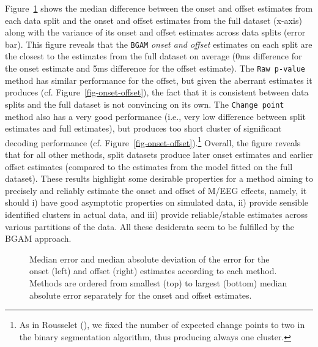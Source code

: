 \documentclass[
  doc,
  floatsintext,
  longtable,
  a4paper,
  nolmodern,
  notxfonts,
  notimes,
  donotrepeattitle,
  colorlinks=true,linkcolor=blue,citecolor=blue,urlcolor=blue]{apa7}
\begin{document}
Figure~\ref{fig-reliability} shows the median difference between the
onset and offset estimates from each data split and the onset and offset
estimates from the full dataset (x-axis) along with the variance of its
onset and offset estimates across data splits (error bar). This figure
reveals that the \texttt{BGAM} \emph{onset and offset} estimates on each
split are the closest to the estimates from the full dataset on average
(0ms difference for the onset estimate and 5ms difference for the offset
estimate). The \texttt{Raw\ p-value} method has similar performance for
the offset, but given the aberrant estimates it produces (cf.
Figure~\ref{fig-onset-offset}), the fact that it is consistent between
data splits and the full dataset is not convincing on its own. The
\texttt{Change\ point} method also has a very good performance (i.e.,
very low difference between split estimates and full estimates), but
produces too short cluster of significant decoding performance (cf.
Figure~\ref{fig-onset-offset}).\footnote{As in Rousselet
  (), we fixed the number of
  expected change points to two in the binary segmentation algorithm,
  thus producing always one cluster.} Overall, the figure reveals that
for all other methods, split datasets produce later onset estimates and
earlier offset estimates (compared to the estimates from the model
fitted on the full dataset). These results highlight some desirable
properties for a method aiming to precisely and reliably estimate the
onset and offset of M/EEG effects, namely, it should i) have good
asymptotic properties on simulated data, ii) provide sensible identified
clusters in actual data, and iii) provide reliable/stable estimates
across various partitions of the data. All these desiderata seem to be
fulfilled by the BGAM approach.

\begin{figure}[!htb]

\caption{\label{fig-reliability}Median error and median absolute
deviation of the error for the onset (left) and offset (right) estimates
according to each method. Methods are ordered from smallest (top) to
largest (bottom) median absolute error separately for the onset and
offset estimates.}


\end{figure}%
\end{document}

